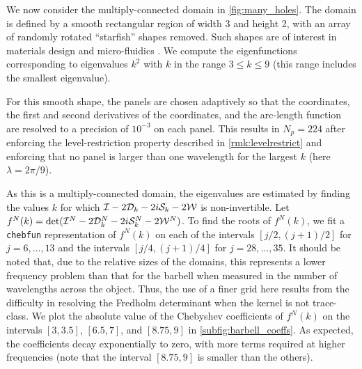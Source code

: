 We now consider the multiply-connected domain in
\cref{fig:many_holes}.
% 
The domain is defined by a smooth rectangular region
of width 3 and height 2,
with an array of randomly rotated ``starfish'' shapes
removed. 
%
Such shapes are of interest in
materials design and micro-fluidics .
%
We compute the eigenfunctions corresponding to
eigenvalues $k^2$ with $k$ in the range
$3 \leq k \leq 9$ (this range includes the smallest
eigenvalue).

%
For this smooth shape, the panels are chosen
adaptively so that the coordinates, the first
and second derivatives of the coordinates, and
the arc-length function are resolved to a precision
of $10^{-3}$ on each panel.
%
This results in $N_p = 224$ after enforcing the
level-restriction property described in
\cref{rmk:levelrestrict}
and enforcing that no panel is larger than
one wavelength for the largest $k$
(here $\lambda=2\pi/9$).

As this is a multiply-connected domain,
the eigenvalues are estimated by finding the values
$k$ for which $\mathcal I-2{\mathcal D}_{k}-2i{\mathcal S}_k-2{\mathcal W}$ is non-invertible.
%
Let $f^N(k) = \det (\mathcal I^N-2{\mathcal D}_{k}^N-2i{\mathcal S}_k^N-2{\mathcal W}^N)$.
To find the roots of $f^N(k)$, we fit a \texttt{chebfun}
representation of $f^N(k)$ on each of the intervals
$[j/2,(j+1)/2]$ for $j = 6,\ldots,13$ and the intervals
$[j/4,(j+1)/4]$ for $j = 28,\ldots,35$.
%
It should be noted that, due to the relative sizes
of the domains,
this represents a lower frequency problem than
that for the barbell when measured in the number
of wavelengths across the object.
%
Thus, the use of a finer grid here results from
the difficulty in resolving the Fredholm determinant
when the kernel is not trace-class.
%
We plot the absolute value of the Chebyshev coefficients
of $f^N(k)$ on the intervals $[3,3.5]$, $[6.5,7]$,
and $[8.75,9]$ in \cref{subfig:barbell_coeffs}.
%
As expected, the coefficients decay exponentially
to zero, with more terms required at higher
frequencies (note that the interval $[8.75,9]$ is
smaller than the others).
%

